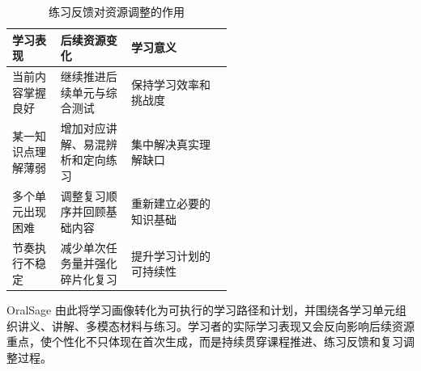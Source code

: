 \begin{table}[H]
  \centering
  \caption{练习反馈对资源调整的作用}
  \label{tab:personalized-feedback-effects}
  \begin{tabularx}{\linewidth}{p{0.22\linewidth}p{0.32\linewidth}X}
    \toprule
    学习表现 & 后续资源变化 & 学习意义 \\
    \midrule
    当前内容掌握良好 & 继续推进后续单元与综合测试 & 保持学习效率和挑战度 \\
    某一知识点理解薄弱 & 增加对应讲解、易混辨析和定向练习 & 集中解决真实理解缺口 \\
    多个单元出现困难 & 调整复习顺序并回顾基础内容 & 重新建立必要的知识基础 \\
    节奏执行不稳定 & 减少单次任务量并强化碎片化复习 & 提升学习计划的可持续性 \\
    \bottomrule
  \end{tabularx}
\end{table}

OralSage 由此将学习画像转化为可执行的学习路径和计划，并围绕各学习单元组织讲义、讲解、多模态材料与练习。学习者的实际学习表现又会反向影响后续资源重点，使个性化不只体现在首次生成，而是持续贯穿课程推进、练习反馈和复习调整过程。


